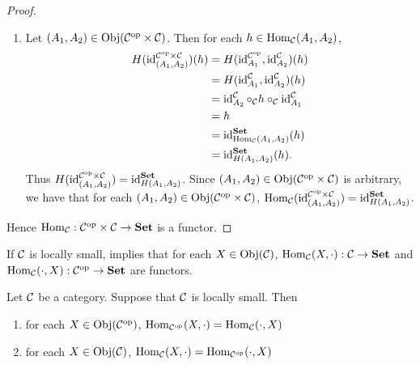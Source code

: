 \documentclass{book}
\begin{document}
\begin{proof}
\begin{enumerate}
	\item Let $(A_1, A_2) \in \Obj(\op{\MC} \times \MC)$. Then for each $h \in \Hom_{\MC}(A_1, A_2)$,
	\begin{align*}
		H(\id_{(A_1, A_2)}^{\op{\MC} \times \MC})(h)
		& = H(\id_{A_1}^{\op{\MC}}, \id_{A_2}^{\MC})(h) \\
		& = H(\id_{A_1}^{\MC}, \id_{A_2}^{\MC})(h) \\
		& = \id_{A_2}^{\MC} \circ_{\MC} h \circ_{\MC} \id_{A_1}^{\MC} \\
		& = h \\
		& = \id_{\Hom_{\MC}(A_1, A_2)}^{\bSet}(h) \\
		& = \id_{H(A_1, A_2)}^{\bSet}(h).
	\end{align*}
	Thus $H(\id_{(A_1, A_2)}^{\op{\MC} \times \MC}) = \id_{H(A_1, A_2)}^{\bSet}$. Since $(A_1, A_2) \in \Obj(\op{\MC} \times \MC)$ is arbitrary, we have that for each $(A_1, A_2) \in \Obj(\op{\MC} \times \MC)$, $\Hom_{\MC}(\id_{(A_1, A_2)}^{\op{\MC} \times \MC}) = \id_{H(A_1, A_2)}^{\bSet}$.
	\end{enumerate}
	Hence $\Hom_{\MC}: \op{\MC} \times \MC \rightarrow \bSet$ is a functor. 
\end{proof}

\begin{note}
	If $\MC$ is locally small,  implies that for each $X \in \Obj(\MC)$, $\Hom_{\MC}(X, \cdot): \MC \rightarrow \bSet$ and $\Hom_{\MC}(\cdot, X): \op{\MC} \rightarrow \bSet$ are functors.
\end{note}

\begin{ex} 
	Let $\MC$ be a category. Suppose that $\MC$ is locally small. Then 
	\begin{enumerate}
		\item for each $X \in \Obj(\op{\MC})$, $\Hom_{\op{\MC}}(X, \cdot) = \Hom_{\MC}(\cdot, X)$
		\item for each $X \in \Obj(\MC)$, $\Hom_{\MC}(X, \cdot) = \Hom_{\op{\MC}}(\cdot, X)$
	\end{enumerate}
\end{ex}
\end{document}
